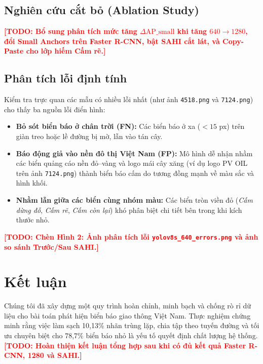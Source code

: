 \documentclass[11pt]{article}
\newcommand{\todo}[1]{\textcolor{red}{\textbf{[TODO: #1]}}}
\begin{document}
\subsection{Nghiên cứu cắt bỏ (Ablation Study)}
\todo{Bổ sung phân tích mức tăng $\Delta\text{AP\_small}$ khi tăng $640\rightarrow 1280$, đổi Small Anchors trên Faster R-CNN, bật SAHI cắt lát, và Copy-Paste cho lớp hiếm Cấm rẽ.}

\subsection{Phân tích lỗi định tính}
Kiểm tra trực quan các mẫu có nhiều lỗi nhất (như ảnh \texttt{4518.png} và \texttt{7124.png}) cho thấy ba nguồn lỗi điển hình:
\begin{itemize}
  \item \textbf{Bỏ sót biển báo ở chân trời (FN):} Các biển báo ở xa ($<15$ px) trên giàn treo hoặc lề đường bị mờ, lẫn vào tán cây.
  \item \textbf{Báo động giả vào nền đô thị Việt Nam (FP):} Mô hình dễ nhận nhầm các biển quảng cáo nền đỏ--vàng và logo mái cây xăng (ví dụ logo PV OIL trên ảnh \texttt{7124.png}) thành biển báo cấm do tương đồng mạnh về màu sắc và hình khối.
  \item \textbf{Nhầm lẫn giữa các biển cùng nhóm màu:} Các biển tròn viền đỏ (\textit{Cấm dừng đỗ}, \textit{Cấm rẽ}, \textit{Cấm còn lại}) khó phân biệt chi tiết bên trong khi kích thước nhỏ.
\end{itemize}
\todo{Chèn Hình 2: Ảnh phân tích lỗi \texttt{yolov8s\_640\_errors.png} và ảnh so sánh Trước/Sau SAHI.}

\section{Kết luận}
\label{sec:conclusion}
Chúng tôi đã xây dựng một quy trình hoàn chỉnh, minh bạch và chống rò rỉ dữ liệu cho bài toán phát hiện biển báo giao thông Việt Nam. Thực nghiệm chứng minh rằng việc làm sạch 10,13\% nhãn trùng lặp, chia tập theo tuyến đường và tối ưu chuyên biệt cho 78,7\% biển báo nhỏ là yếu tố quyết định chất lượng hệ thống. \todo{Hoàn thiện kết luận tổng hợp sau khi có đủ kết quả Faster R-CNN, 1280 và SAHI.}

\end{document}
